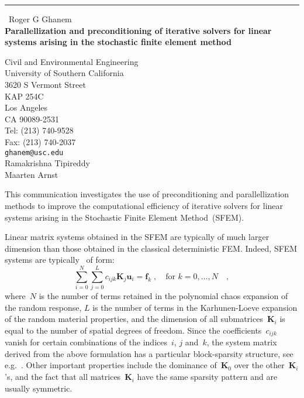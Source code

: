 \documentclass{report}
\begin{document}
\begin{center}
\rule{6in}{1pt} \
{\large Roger G Ghanem \\
{\bf Parallellization and preconditioning of iterative solvers for linear systems arising in the stochastic finite element method}}

Civil and Environmental Engineering \\ University of Southern California \\ 3620 S Vermont Street \\ KAP 254C \\ Los Angeles \\ CA 90089-2531 \\ Tel: (213) 740-9528 \\ Fax: (213) 740-2037
\\
{\tt ghanem@usc.edu}\\
Ramakrishna Tipireddy\\
Maarten Arnst\end{center}

This communication investigates the use of preconditioning and
parallellization methods to improve the computational efficiency of
iterative solvers for linear systems arising in the Stochastic Finite
Element Method~(SFEM).

Linear matrix systems obtained in the SFEM are typically of much larger
dimension than those obtained in the classical deterministic FEM. Indeed,
SFEM systems are typically~\cite{ghanem1991} of form:
\begin{equation}
\sum_{i=0}^{N}\sum_{j=0}^{L}c_{ijk}\boldsymbol{K}_{j}\boldsymbol{u}_{i}=\boldsymbol{f}_{k}\;,\quad\text{for~$k
= 0,\ldots,N$}\quad,\label{eq:sfemsystem}
\end{equation}
where~$N$ is the number of terms retained in the polynomial chaos
expansion of the random response, $L$ is the number of terms in the
Karhunen-Loeve expansion of the random material properties, and the
dimension of all submatrices~$\boldsymbol{K}_{i}$ is equal to the number
of spatial degrees of freedom. Since the coefficients~$c_{ijk}$ vanish
for certain combinations of the indices~$i$, $j$ and~$k$, the system
matrix derived from the above formulation has a particular block-sparsity
structure, see e.g.~\cite{pellisetti2000}. Other important properties
include the dominance of~$\boldsymbol{K}_0$ over the
other~$\boldsymbol{K}_i$'s, and the fact that all
matrices~$\boldsymbol{K}_i$ have the same sparsity pattern and are
usually symmetric.
\end{document}
